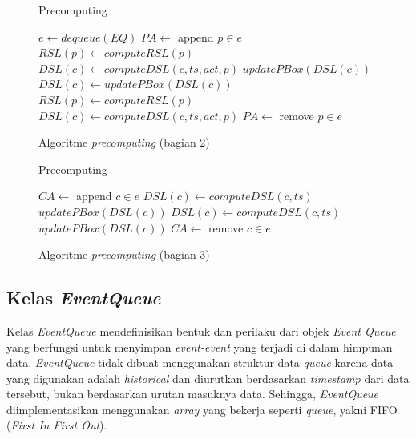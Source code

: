 \begin{figure}[H]
	\begin{algorithm}[H]
		\caption{Precomputing}
		\begin{algorithmic}[1]
			\State $e \leftarrow dequeue(EQ)$
			\State $PA \leftarrow$ append $p \in e$
			\State $RSL(p) \leftarrow computeRSL(p)$
			\State $DSL(c) \leftarrow computeDSL(c, ts, act, p)$
			\EndFor
			\State $updatePBox(DSL(c))$
			\EndFor
			\State $DSL(c) \leftarrow updatePBox(DSL(c))$
			\EndFor
			\State $RSL(p) \leftarrow computeRSL(p)$
			\State $DSL(c) \leftarrow computeDSL(c, ts, act, p)$
			\EndFor
			\State $PA \leftarrow$ remove $p \in e$
			\EndIf
		\end{algorithmic}
	\end{algorithm}
	\caption{Algoritme \textit{precomputing} (bagian 2) \label{algo:main-func-2}}
\end{figure}
			
\begin{figure}[H]
	\begin{algorithm}[H]
		\caption{Precomputing}
		\begin{algorithmic}[1]
			\State $CA \leftarrow$ append $c \in e$ 
			\State $DSL(c) \leftarrow computeDSL(c, ts)$
			\State $updatePBox(DSL(c))$
			\State $DSL(c) \leftarrow computeDSL(c, ts)$
			\State $updatePBox(DSL(c))$
			\State $CA \leftarrow$ remove $c \in e$ 
			\EndIf
			\EndIf
			\EndWhile
		\end{algorithmic}
	\end{algorithm}
	\caption{Algoritme \textit{precomputing} (bagian 3) \label{algo:main-func-3}}
\end{figure}

\subsection{Kelas \textit{EventQueue}}
\tab Kelas \textit{EventQueue} mendefinisikan bentuk dan perilaku dari objek \textit{Event Queue} yang berfungsi untuk menyimpan \textit{event-event} yang terjadi di dalam himpunan data. \textit{EventQueue} tidak dibuat menggunakan struktur data \textit{queue} karena data yang digunakan adalah \textit{historical} dan diurutkan berdasarkan \textit{timestamp} dari data tersebut, bukan berdasarkan urutan masuknya data. Sehingga, \textit{EventQueue} diimplementasikan menggunakan \textit{array} yang bekerja seperti \textit{queue}, yakni FIFO (\textit{First In First Out}). 

